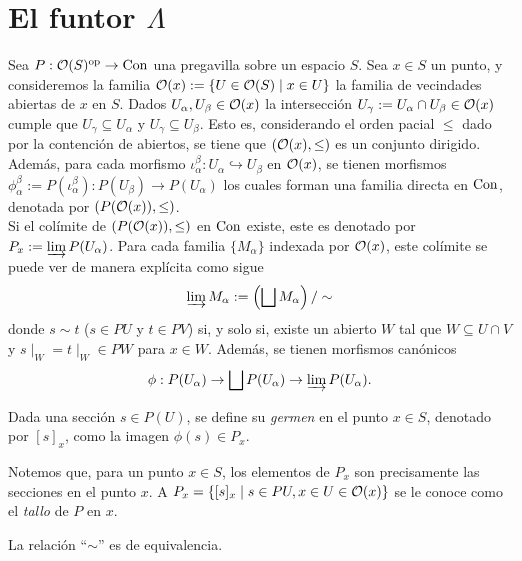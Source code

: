 \section{El funtor $\Lambda$}
Sea $P:{\mathcal O}(S)^{{\mathrm{op}}}\to{\mathrm{Con}}$ una pregavilla sobre un espacio $S$. Sea $x\in S$ un punto, y consideremos la familia ${\mathcal O}(x):=\{U\in {\mathcal O}(S)\mid x\in U\}$ la familia de vecindades abiertas de $x$ en $S$. Dados $U_\alpha, U_\beta\in {\mathcal O}(x)$ la intersección $U_\gamma:=U_\alpha\cap U_\beta\in{\mathcal O}(x)$ cumple que $U_\gamma\subseteq U_\alpha$ y $U_\gamma\subseteq U_\beta$. Esto es, considerando el orden pacial $\leq$ dado por la contención de abiertos, se tiene que $({\mathcal O}(x),\leq)$ es un conjunto dirigido. Además, para cada morfismo  $\iota^\beta_\alpha:U_\alpha\hookrightarrow U_\beta$ en ${\mathcal O}(x)$, se tienen morfismos $\phi^\beta_\alpha:= P(\iota^\beta_\alpha): P(U_\beta)\to P(U_\alpha)$ los cuales forman una familia directa en ${\mathrm{Con}}$, denotada por $(P({\mathcal O}(x)),\leq)$. \\
Si el colímite de $(P({\mathcal O}(x)), \leq )$ en ${\mathrm{Con}}$ existe, este es denotado por $P_x:=\varinjlim P(U_\alpha)$. Para cada familia $\{M_\alpha\}$ indexada por ${\mathcal O}(x)$, este colímite se puede ver de manera explícita como sigue 
\begin{equation*}
     \varinjlim M_\alpha:=\left(\bigsqcup M_\alpha\right)/\sim
\end{equation*}
donde $s\sim t$ ($s\in PU$ y $t\in PV$) si, y solo si, existe un abierto $W$ tal que $W\subseteq U\cap V$ y  $s\mid_W=t\mid_W\in PW$ para $x\in W$. Además, se tienen morfismos canónicos 
\begin{eqnarray*}
    \phi:P(U_\alpha)\to\bigsqcup P(U_\alpha)\to\varinjlim P(U_\alpha).
\end{eqnarray*}
\begin{definition}[Germen]
    Dada una sección $s\in P(U)$, se define su \emph{germen} en el punto $x\in S$, denotado por $[s]_x$, como la imagen  $\phi(s)\in P_x$. 
\end{definition}
Notemos que, para un punto $x\in S$, los elementos de $P_x$ son precisamente las secciones en el punto $x$. A $P_x=\{[s]_x\mid s\in PU, x\in U\in{\mathcal O}(x)\}$ se le conoce como el \emph{tallo} de $P$ en $x$. 
\begin{lema}
    La relación ``$\sim$'' es de equivalencia. 
\end{lema}
